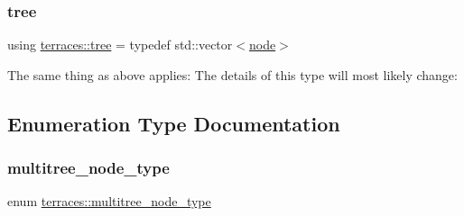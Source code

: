 \subsubsection{\texorpdfstring{tree}{tree}}
{\footnotesize\ttfamily using \hyperlink{namespaceterraces_a07aaf7feec4a22c6cdefc14c5a81bdd0}{terraces\+::tree} = typedef std\+::vector$<$\hyperlink{structterraces_1_1node}{node}$>$}

The same thing as above applies\+: The details of this type will most likely change\+: 

\subsection{Enumeration Type Documentation}
\mbox{\label{namespaceterraces_ae1e4987c27eddd3b87041a2f0479bcc1}} 
\subsubsection{\texorpdfstring{multitree\+\_\+node\+\_\+type}{multitree\_node\_type}}
{\footnotesize\ttfamily enum \hyperlink{namespaceterraces_ae1e4987c27eddd3b87041a2f0479bcc1}{terraces\+::multitree\+\_\+node\+\_\+type}\hspace{0.3cm}{\ttfamily [strong]}}


